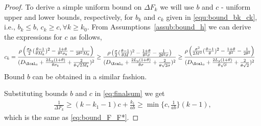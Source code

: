 \documentclass[11pt]{article}
\numberwithin{equation}{section}
\begin{document}
\begin{proof}
	To derive  a simple uniform bound on  $\Delta F_{k }$ we will use  $b$ and $c$ - uniform upper and lower bounds, respectively, for $b_k$ and $c_k$ given in \eqref{equ:bound_bk_ck}, i.e., $b_k \leq b$, $c_k \geq c, \forall k\geq k_0$. 
	From Assumptions~\ref{assub:bound_h} we can derive the expressions for $c$ as follows,
	\begin{align*}
	    c_k
	    &= \frac{\rho \left( \frac{\sigma_k}{2}(\frac{\theta-1}{\theta M_k})^2 - \frac{1+\theta}{\theta^2\sigma_k}- \frac{1}{2\theta^2M_k} \right)}{(D_{\Xcal_0} + \frac{2L_g(1+\theta)}{\theta\sigma_k} + \frac{2}{\theta\sqrt{2M_k}})^2} 
	    \geq \frac{\rho \left( \frac{\sigma}{2}(\frac{\theta-1}{\theta M})^2 - \frac{1+\theta}{\theta^2\sigma}- \frac{1}{2\theta^2\sigma} \right)}{(D_{\Xcal_0} + \frac{2L_g(1+\theta)}{\theta\sigma} + \frac{2}{\theta\sqrt{2\sigma}})^2} 
	    \geq \frac{\rho \left( \frac{\sigma^2}{2M^2}(\frac{\theta-1}{\theta})^2 - \frac{1+\theta}{\theta^2}- \frac{1}{2\theta^2} \right)}{(D_{\Xcal_0} + \frac{2L_g(1+\theta)}{\theta\sqrt{\sigma}} + \frac{2}{\theta\sqrt{2}})^2} 
	\end{align*}
	Bound $b$ can be obtained in a similar fashion.

Substituting bounds $b$ and $c$ in \eqref{eq:finalsum} we get 
\begin{align*}
	    \frac{1}{\Delta F_{k }} \geq (k-k_1-1)c+ \frac{k_1} {a b}\geq \min\{c, \frac{1} {a b}\}(k-1),
	    \end{align*}
 which is the same as   \eqref{eq:bound_F_F*}.


	
\end{proof}




\end{document}
